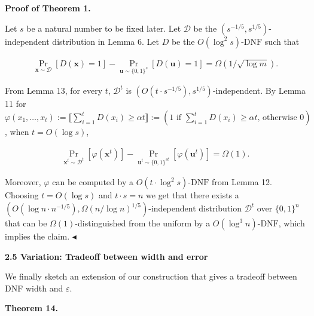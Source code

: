 \documentclass[10pt,a4paper]{article}
\begin{document}
\par\medskip\noindent\textbf{Proof of Theorem 1.}\par




Let $s$ be a natural number to be fixed later. Let $\mathcal{D}$ be the $(s^{-1/5},s^{1/5})$-independent distribution in Lemma 6. Let $D$ be the $O(\log^{2}s)$-$\mathrm{DNF}$ such that\par


\[\begin{gathered}
\Pr_{\bm{x}\sim\mathcal{D}}[D(\bm{x})=1]-\Pr_{\bm{u}\sim\{0,1\}^{s}}[D(\bm{u})=1]=\Omega(1/\sqrt{\log m}).
\end{gathered}\]


From Lemma 13, for every $t$, $\mathcal{D}^{t}$ is $(O(t\cdot s^{-1/5}),s^{1/5})$-independent. By Lemma 11 for $\varphi(x_{1},\dots,x_{t}):=\llbracket\sum_{i=1}^{t}D(x_{i})\geq\alpha t\rrbracket:=(1\text{ if }\sum_{i=1}^{t}D(x_{i})\geq\alpha t\text{, otherwise }0)$, when $t=O(\log s)$,\par


\[\begin{gathered}
\Pr_{\bm{x}^{t}\sim\mathcal{D}^{t}}\left[\varphi(\bm{x}^{t})\right]-\Pr_{\bm{u}^{t}\sim\{0,1\}^{st}}\left[\varphi(\bm{u}^{t})\right]=\Omega(1).
\end{gathered}\]


Moreover, $\varphi$ can be computed by a $O(t\cdot\log^{2}s)$-$\mathrm{DNF}$ from Lemma 12.
Choosing $t=O(\log s)$ and $t\cdot s=n$ we get that there exists a $(O(\log n\cdot n^{-1/5}),\Omega(n/\log n)^{1/5})$-independent distribution $\mathcal{D}^{t}$ over $\{0,1\}^{n}$ that can be $\Omega(1)$-distinguished from the uniform by a $O(\log^{3}n)$-$\mathrm{DNF}$, which implies the claim.
$\blacktriangleleft$\par






\par\medskip\noindent\textbf{
2.5 Variation: Tradeoff between width and error}\par




We finally sketch an extension of our construction that gives a tradeoff between DNF width and $\varepsilon$.\par





\par\medskip\noindent\textbf{
\textbf{Theorem 14}\textbf{.}
}\par
\end{document}
